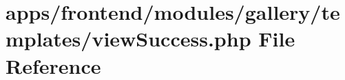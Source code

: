 \hypertarget{frontend_2modules_2gallery_2templates_2view_success_8php}{\section{apps/frontend/modules/gallery/templates/view\-Success.php File Reference}
\label{frontend_2modules_2gallery_2templates_2view_success_8php}
}
